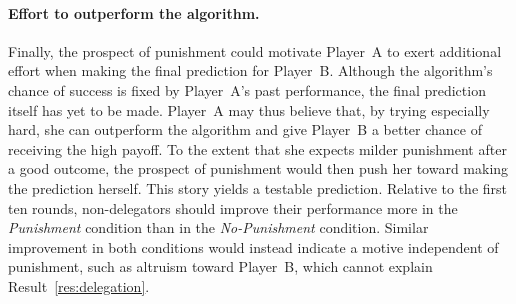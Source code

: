 
\paragraph{Effort to outperform the algorithm.} Finally, the prospect of punishment could motivate Player~A to exert additional effort when making the final prediction for Player~B. Although the algorithm's chance of success is fixed by Player~A's past performance, the final prediction itself has yet to be made. Player~A may thus believe that, by trying especially hard, she can outperform the algorithm and give Player~B a better chance of receiving the high payoff. To the extent that she expects milder punishment after a good outcome, the prospect of punishment would then push her toward making the prediction herself. This story yields a testable prediction. Relative to the first ten rounds, non-delegators should improve their performance more in the \textit{Punishment} condition than in the \textit{No-Punishment} condition. Similar improvement in both conditions would instead indicate a motive independent of punishment, such as altruism toward Player~B, which cannot explain Result~\ref{res:delegation}.

